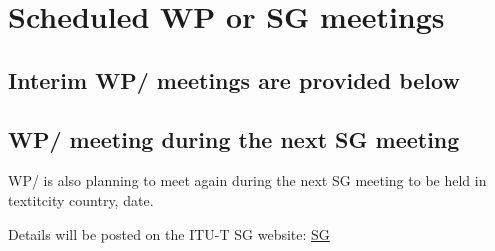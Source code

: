 


\section{Scheduled WP or SG\studyGroup{} meetings}\label{scheduled-wp-or-sg-meetings}

\subsection{Interim WP\workingParty/\studyGroup{} meetings are provided below}\label{interim-wp-meetings}

\wpScheduledMeetings

\subsection{WP\workingParty/\studyGroup{} meeting during the next SG\studyGroup{} meeting}\label{wp-meeting-during-next-sg-meeting}

WP\workingParty/\studyGroup{} is also planning to meet again during the next SG\studyGroup{} meeting to be held in textit{city country, date}.

Details will be posted on the ITU-T SG\studyGroup{} website: \href{https://www.itu.int/go/tsg17}{SG\studyGroup{}}
